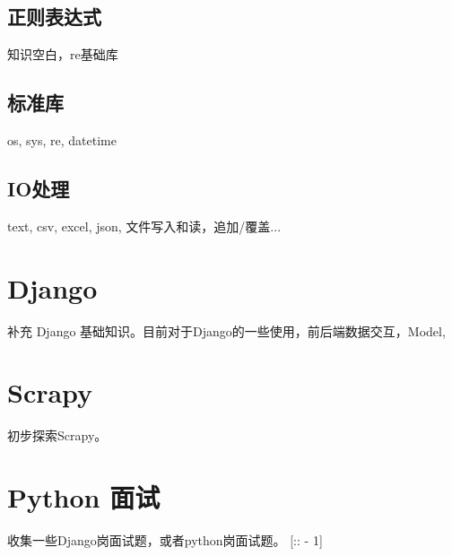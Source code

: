 \documentclass[UTF8]{article}
\begin{document}
\subsection{正则表达式}
知识空白，re基础库

\subsection{标准库}
os, sys, re, datetime

\subsection{IO处理}
text, csv, excel, json, 文件写入和读，追加/覆盖...

\section{Django}

补充 Django 基础知识。目前对于Django的一些使用，前后端数据交互，Model,


\section{Scrapy}
初步探索Scrapy。

\section{Python 面试}
收集一些Django岗面试题，或者python岗面试题。
[:: - 1]
\end{document}
